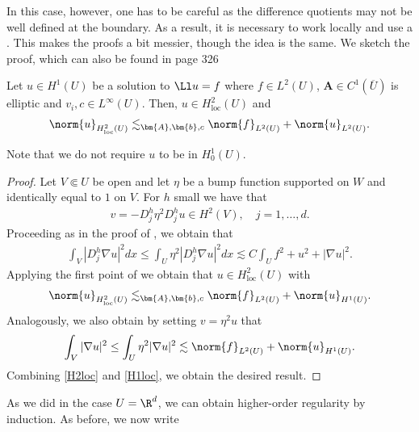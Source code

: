 \documentclass[
    a4paper,
    DIV=14,
    abstract=true,
    numbers=noenddot
]{scrartcl}
\begin{document}
In this case, however, one has to be careful as the difference quotients may not be well defined at the boundary. As a result, it is necessary to work locally and use a . This makes the proofs a bit messier, though the idea is the same. We sketch the proof, which can also be found in \cite{evans2022partial} page 326
\begin{theorem}\label{higher regularity}
    Let $u \in H^1(U)$ be a solution to $\Ll u =f$ where $f \in L^2(U)$, $\bm{A} \in C^1(\overline{U} )$ is elliptic and $v_i,c \in L^\infty(U)$. Then, $u \in H^2 _{\mathrm{loc}} (U)$ and
    \begin{align*}
        \norm{u}_{H^2 _{\mathrm{loc}}(U)} \lesssim_{\bm{A},\bm{b},c} \norm{f}_{L^2(U)}+\norm{u}_{L^2(U)}.
    \end{align*}
\end{theorem}
Note that we do not require $u$ to be in $H^1_0(U)$.
\begin{proof}
    Let $V \Subset U$ be open and let $\eta $ be a bump function supported on $W$ and identically equal to $1$ on $V$. For $h$ small we have that
    \begin{align}\label{difference bounded}
        v = - D_j^h \eta^2 D_j^h u \in H^2(V),\quad  j=1,\ldots,d.
    \end{align}
    Proceeding as in the proof of , we obtain that
    \begin{align*}
        \int_V\left|D_j^h \nabla u\right|^2 d x \leq \int_U \eta^2\left|D_j^h \nabla u\right|^2 d x \lesssim C \int_U f^2+u^2+|\nabla u|^2.
    \end{align*}
    Applying the first point of  we obtain that $u \in H^2_{\mathrm{loc}}(U)$ with
    \begin{align}\label{H2loc}
        \norm{u}_{H^2 _{\mathrm{loc}} (U)} \lesssim_{\bm{A},\bm{b},c} \norm{f}_{L^2(U)}+\norm{u}_{H^1(U)}.
    \end{align}
    Analogously, we also obtain by setting $v= \eta ^2 u$ that
    \begin{align}\label{H1loc}
        \int_V |\nabla u|^2 \leq\int_U \eta ^2 |\nabla u|^2 \lesssim \norm{f}_{L^2(U)}+\norm{u}_{H^1(U)}.
    \end{align}
    Combining \eqref{H2loc} and \eqref{H1loc}, we obtain the desired result.
\end{proof}
As we did in the case $U=\R^d$, we can obtain higher-order regularity by induction. As before, we now write
\end{document}
